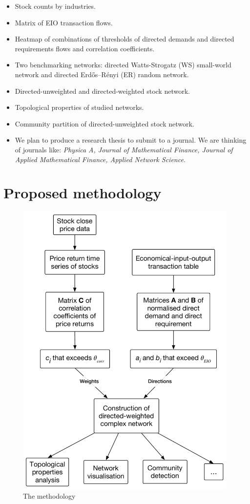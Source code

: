 \begin{itemize}
	\item Stock counts by industries.
	\item Matrix of EIO transaction flows.
	\item Heatmap of combinations of thresholds of directed demands and directed requirements flows and correlation coefficients.
	\item Two benchmarking networks: directed Watts-Strogatz (WS) small-world network and directed Erdős–Rényi (ER) random network.
	\item Directed-unweighted and directed-weighted stock network.
	\item Topological properties of studied networks.
	\item Community partition of directed-unweighted stock network.
	\item We plan to produce a research thesis to submit to a journal. We are thinking of journals like:  \textit{Physica A, Journal of Mathematical Finance, Journal of Applied Mathematical Finance, Applied Network Science}.
\end{itemize}

\section{Proposed methodology}
\begin{figure}
	\begin{center}
		\includegraphics[width=11cm]{methodology_diagram}
	\end{center}
	\caption{The methodology}
	\label{fig:methodology_diagram}
\end{figure}

